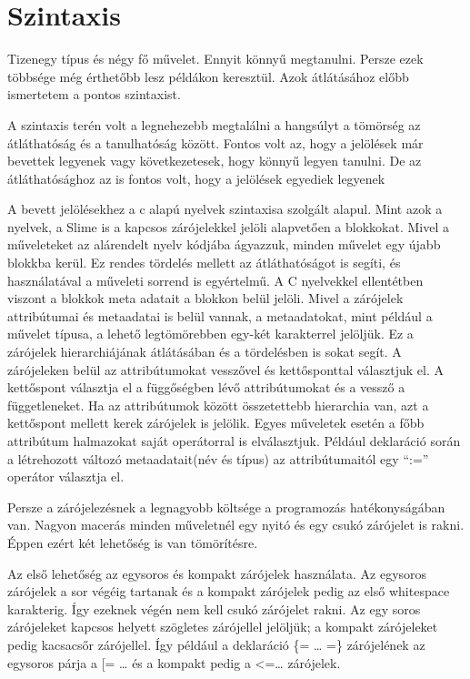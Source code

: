 \section{Szintaxis}
Tizenegy típus és négy fő művelet. 
Ennyit könnyű megtanulni. 
Persze ezek többsége még érthetőbb lesz példákon keresztül. 
Azok átlátásához előbb ismertetem a pontos szintaxist.

A szintaxis terén volt a legnehezebb megtalálni a hangsúlyt a tömörség az átláthatóság és a tanulhatóság között. 
Fontos volt az, hogy a jelölések már bevettek legyenek vagy következetesek, hogy könnyű legyen tanulni. 
De az átláthatósághoz az is fontos volt, hogy a jelölések egyediek legyenek

A bevett jelölésekhez a c alapú nyelvek szintaxisa szolgált alapul. Mint azok a nyelvek, a Slime is a kapcsos zárójelekkel jelöli alapvetően a blokkokat. Mivel a műveleteket az alárendelt nyelv kódjába ágyazzuk, minden művelet egy újabb blokkba kerül. Ez rendes tördelés mellett az átláthatóságot is segíti, és használatával a műveleti sorrend is egyértelmű. A C nyelvekkel ellentétben viszont a blokkok meta adatait a blokkon belül jelöli. Mivel a zárójelek attribútumai és metaadatai is belül vannak, a metaadatokat, mint például a művelet típusa, a lehető legtömörebben egy-két karakterrel jelöljük. Ez a zárójelek hierarchiájának átlátásában és a tördelésben is sokat segít. A zárójeleken belül az attribútumokat vesszővel és kettősponttal választjuk el. A kettőspont választja el a függőségben lévő attribútumokat és a vessző a függetleneket. Ha az attribútumok között összetettebb hierarchia van, azt a kettőspont mellett kerek zárójelek is jelölik. Egyes műveletek esetén a főbb attribútum halmazokat saját operátorral is elválasztjuk. Például deklaráció során a létrehozott változó metaadatait(név és típus) az attribútumaitól egy “:=” operátor választja el.

Persze a zárójelezésnek a legnagyobb költsége a programozás hatékonyságában van. Nagyon macerás minden műveletnél egy nyitó és egy csukó zárójelet is rakni. Éppen ezért két lehetőség is van tömörítésre.

Az első lehetőség az egysoros és kompakt zárójelek használata. Az egysoros zárójelek a sor végéig tartanak és a kompakt zárójelek pedig az első whitespace karakterig. Így ezeknek végén nem kell csukó zárójelet rakni. Az egy soros zárójeleket kapcsos helyett szögletes zárójellel jelöljük; a kompakt zárójeleket pedig kacsacsőr zárójellel. Így például a deklaráció \{= … =\} zárójelének az egysoros párja a [= … és a kompakt pedig a <=… zárójelek.

